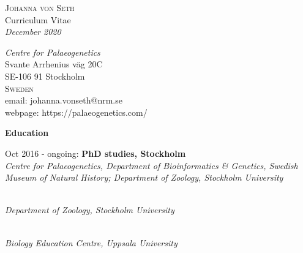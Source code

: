 \documentclass[10pt,letterpaper]{article}
\begin{document}
	\pagestyle{empty}
	
	\begin{flushleft}
		\textsc{\Large Johanna von Seth}\\
		\smallskip
		\small Curriculum Vitae\\
		\textit{\small December 2020}\\	
	\end{flushleft}
	
	\begin{flushright} 
		\textit{Centre for Palaeogenetics}\\
		Svante Arrhenius väg 20C\\
		SE-106 91 Stockholm\\
		\textsc{Sweden}\\
		email: johanna.vonseth@nrm.se\\
		webpage: https://palaeogenetics.com/\\
	\end{flushright} 
	
	\bigskip
	
	\noindent \textbf{\Large Education}

	\medskip
	
		\noindent \small Oct 2016 - ongoing: \textbf{PhD studies, Stockholm}\\
		\textit{\footnotesize Centre for Palaeogenetics, Department of Bioinformatics \& Genetics, Swedish Museum of Natural History; Department of Zoology, Stockholm University}

		\medskip

		\\ 
		\textit{\footnotesize Department of Zoology, Stockholm University}

		\medskip
	
		\\
		\textit{\footnotesize Biology Education Centre, Uppsala University}

	\bigskip
	
	\nocite{*} %
		\renewcommand\refname{\textsc{Publications}}
		
		
\end{document}
